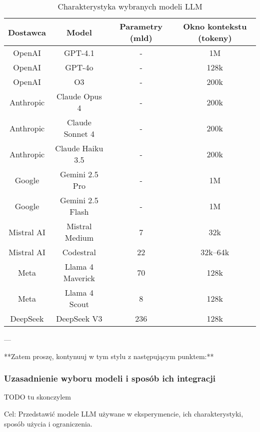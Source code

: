 \begin{table}[!h] \centering
\caption{Charakterystyka wybranych modeli LLM}
\label{tab:llm-characteristic}
\begin{tabular}{| c | c | c | c |} \hline
\textbf{Dostawca} & \textbf{Model} & \textbf{Parametry (mld)} & \textbf{Okno kontekstu (tokeny)} \\ \hline\hline
OpenAI & GPT-4.1 & - & 1M \\ \hline
OpenAI & GPT-4o & - & 128k \\ \hline
OpenAI & O3 & - & 200k \\ \hline
Anthropic & Claude Opus 4 & - & 200k \\ \hline
Anthropic & Claude Sonnet 4 & - & 200k \\ \hline
Anthropic & Claude Haiku 3.5 & - & 200k \\ \hline
Google & Gemini 2.5 Pro & - & 1M \\ \hline
Google & Gemini 2.5 Flash & - & 1M \\ \hline
Mistral AI & Mistral Medium & 7 & 32k \\ \hline
Mistral AI & Codestral & 22 & 32k–64k \\ \hline
Meta & Llama 4 Maverick & 70 & 128k \\ \hline
Meta & Llama 4 Scout & 8 & 128k \\ \hline
DeepSeek & DeepSeek V3 & 236 & 128k \\ \hline
\end{tabular}
\end{table}

---



**Zatem proszę, kontynuuj w tym stylu z następującym punktem:**

\subsubsection{Uzasadnienie wyboru modeli i sposób ich integracji}

TODO tu skonczylem

Cel: Przedstawić modele LLM używane w eksperymencie, ich charakterystyki, sposób użycia i ograniczenia.

